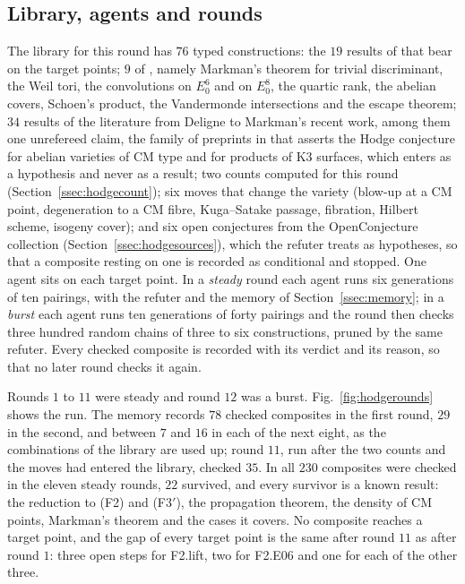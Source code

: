 \subsection{Library, agents and rounds}\label{ssec:hodgerun}

The library for this round has $76$ typed constructions: the $19$ results of \cite{BB26c} that bear on the target points; $9$ of \cite{BMB26b}, namely Markman's theorem for trivial discriminant, the Weil tori, the convolutions on $E_{0}^{6}$ and on $E_{0}^{8}$, the quartic rank, the abelian covers, Schoen's product, the Vandermonde intersections and the escape theorem; $34$ results of the literature from Deligne to Markman's recent work, among them one unrefereed claim, the family of preprints in \cite{OAI26b} that asserts the Hodge conjecture for abelian varieties of CM type and for products of K3 surfaces, which enters as a hypothesis and never as a result; two counts computed for this round (Section~\ref{ssec:hodgecount}); six moves that change the variety (blow-up at a CM point, degeneration to a CM fibre, Kuga--Satake passage, fibration, Hilbert scheme, isogeny cover); and six open conjectures from the OpenConjecture collection (Section~\ref{ssec:hodgesources}), which the refuter treats as hypotheses, so that a composite resting on one is recorded as conditional and stopped. One agent sits on each target point. In a \emph{steady} round each agent runs six generations of ten pairings, with the refuter and the memory of Section~\ref{ssec:memory}; in a \emph{burst} each agent runs ten generations of forty pairings and the round then checks three hundred random chains of three to six constructions, pruned by the same refuter. Every checked composite is recorded with its verdict and its reason, so that no later round checks it again.

Rounds $1$ to $11$ were steady and round $12$ was a burst. Fig.~\ref{fig:hodgerounds} shows the run. The memory records $78$ checked composites in the first round, $29$ in the second, and between $7$ and $16$ in each of the next eight, as the combinations of the library are used up; round $11$, run after the two counts and the moves had entered the library, checked $35$. In all $230$ composites were checked in the eleven steady rounds, $22$ survived, and every survivor is a known result: the reduction to (F2) and (F3$'$), the propagation theorem, the density of CM points, Markman's theorem and the cases it covers. No composite reaches a target point, and the gap of every target point is the same after round $11$ as after round $1$: three open steps for F2.lift, two for F2.E06 and one for each of the other three.

